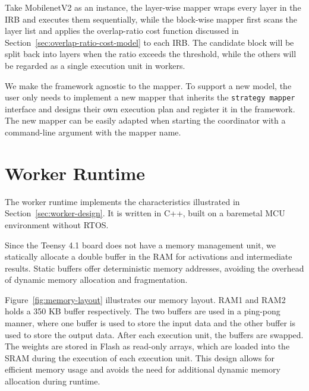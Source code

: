 
Take MobilenetV2 as an instance, the layer-wise mapper wraps every layer in the IRB and executes them sequentially, while the block-wise mapper first scans the layer list and applies the overlap-ratio cost function discussed in Section~\ref{sec:overlap-ratio-cost-model} to each IRB. The candidate block will be split back into layers when the ratio exceeds the threshold, while the others will be regarded as a single execution unit in workers. 


We make the framework agnostic to the mapper. To support a new model, the user only needs to implement a new mapper that inherits the \verb|strategy mapper| interface and designs their own execution plan and register it in the framework. The new mapper can be easily adapted when starting the coordinator with a command-line argument with the mapper name. 

\section{Worker Runtime}
\label{sec:implementation-worker-runtime}



The worker runtime implements the characteristics illustrated in Section~\ref{sec:worker-design}. It is written in C++, built on a baremetal MCU environment without RTOS.

Since the Teensy 4.1 board does not have a memory management unit, we statically allocate a double buffer in the RAM for activations and intermediate results. Static buffers offer deterministic memory addresses, avoiding the overhead of dynamic memory allocation and fragmentation. 

Figure~\ref{fig:memory-layout} illustrates our memory layout. RAM1 and RAM2 holds a 350 KB buffer respectively. The two buffers are used in a ping-pong manner, where one buffer is used to store the input data and the other buffer is used to store the output data. After each execution unit, the buffers are swapped. The weights are stored in Flash as read-only arrays, which are loaded into the SRAM during the execution of each execution unit. This design allows for efficient memory usage and avoids the need for additional dynamic memory allocation during runtime. 

